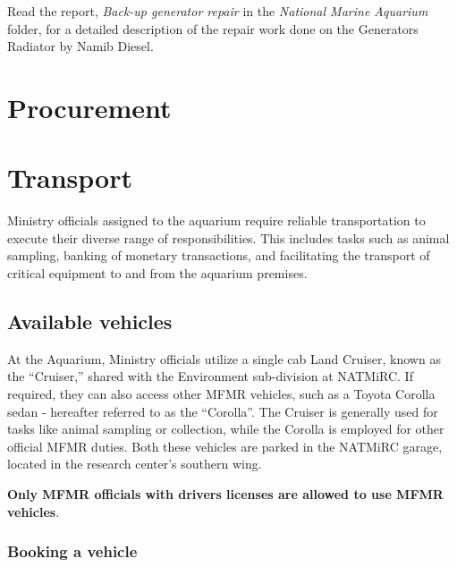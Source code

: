 \documentclass[
  12pt,
]{report}
\begin{document}
{Read the report, \emph{Back-up generator repair} in the \emph{National
Marine Aquarium} folder, for a detailed description of the repair work
done on the Generators Radiator by Namib Diesel}.

\newpage

\hypertarget{procurement}{%
\chapter{Procurement}\label{procurement}}

\newpage

\hypertarget{transport}{%
\chapter{Transport}\label{transport}}

Ministry officials assigned to the aquarium require reliable
transportation to execute their diverse range of responsibilities. This
includes tasks such as animal sampling, banking of monetary
transactions, and facilitating the transport of critical equipment to
and from the aquarium premises.

\hypertarget{available-vehicles}{%
\section{Available vehicles}\label{available-vehicles}}

At the Aquarium, Ministry officials utilize a single cab Land Cruiser,
known as the ``Cruiser,'' shared with the Environment sub-division at
NATMiRC. If required, they can also access other MFMR vehicles, such as
a Toyota Corolla sedan - hereafter referred to as the ``Corolla''. The
Cruiser is generally used for tasks like animal sampling or collection,
while the Corolla is employed for other official MFMR duties. Both these
vehicles are parked in the NATMiRC garage, located in the research
center's southern wing.

\textbf{Only MFMR officials with drivers licenses are allowed to use
MFMR vehicles}.

\hypertarget{sec-book-vehicle}{%
\subsection{Booking a vehicle}\label{sec-book-vehicle}}
\end{document}
